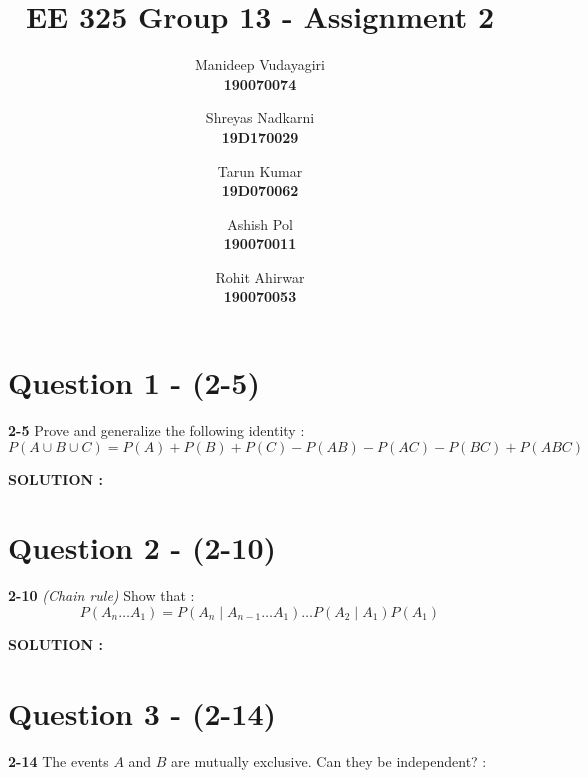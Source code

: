 \documentclass{article}
\begin{document}
\title{EE 325 Group 13 - Assignment 2 }
\author{
	Manideep Vudayagiri\\
	\textbf{190070074}
	\and
	Shreyas Nadkarni\\
	\textbf{19D170029}
	\and
	Tarun Kumar\\
	\textbf{19D070062}
	\and
	Ashish Pol\\
	\textbf{190070011}
	\and
	Rohit Ahirwar\\
	\textbf{190070053}
	
	
}

\maketitle
\tableofcontents
\thispagestyle{empty}
\clearpage
{}

\newpage

\section{Question 1 - (2-5)}
\label{Q1}
\textbf{2-5} Prove and generalize the following identity : \\
\begin{equation*}
	P(A \cup B \cup C) = P(A) + P(B) + P(C) - P(AB) - P(AC) - P(BC) + P(ABC)
\end{equation*}

\hspace{1em} \large{\textbf{SOLUTION :}} \\

\section{Question 2 - (2-10)}
\label{Q2}
\textbf{2-10} \textit{(Chain rule)} Show that  : \\
\begin{equation*}
	P(A_n \dots A_1) = P(A_n \mid A_{n-1} \dots A_1) \dots P(A_2 \mid A_1)P(A_1)
\end{equation*}

\hspace{1em} \large{\textbf{SOLUTION :}} \\

\section{Question 3 - (2-14)}
\label{Q3}
\textbf{2-14}  The events $A$ and $B$ are mutually exclusive. Can they be independent?  : \\
\end{document}
